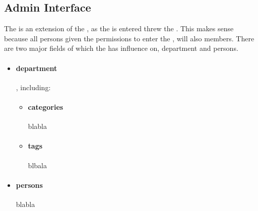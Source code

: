 \subsection{Admin Interface}
\label{sec:admininterface}

The \ainterface[] is an extension of the \sinterface[], as the \ainterface[] is entered threw the \sinterface[]. This makes sense because all persons given the permissions to enter the \ainterface[], will also \astaff[] members. There are two major fields of which the \admin[] has influence on, department and persons.

\begin{itemize}
	\item \paragraph{department}, including:
	\begin{itemize}
		\item \paragraph{categories} blabla
		\item \paragraph{tags} blbala
	\end{itemize}
	\item \paragraph{persons} blabla
\end{itemize}